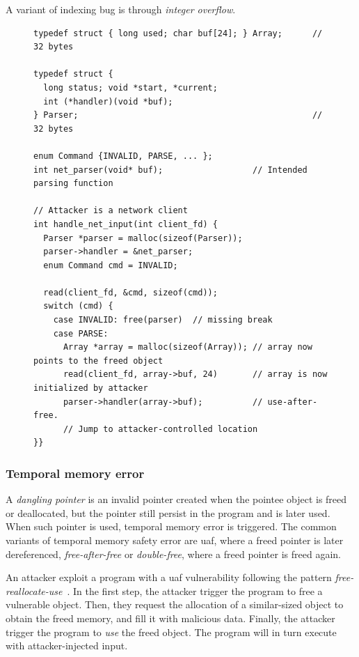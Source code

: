 \documentclass[11pt]{memoir}
\begin{document}
A variant of indexing bug is through \emph{integer overflow}.







\begin{figure}[t]
\begin{verbatim}
typedef struct { long used; char buf[24]; } Array;      // 32 bytes

typedef struct {
  long status; void *start, *current;
  int (*handler)(void *buf);
} Parser;                                               // 32 bytes

enum Command {INVALID, PARSE, ... };
int net_parser(void* buf);                  // Intended parsing function

// Attacker is a network client
int handle_net_input(int client_fd) {
  Parser *parser = malloc(sizeof(Parser));
  parser->handler = &net_parser; 
  enum Command cmd = INVALID;

  read(client_fd, &cmd, sizeof(cmd));
  switch (cmd) {
    case INVALID: free(parser)  // missing break
    case PARSE:
      Array *array = malloc(sizeof(Array)); // array now points to the freed object 
      read(client_fd, array->buf, 24)       // array is now initialized by attacker
      parser->handler(array->buf);          // use-after-free.
      // Jump to attacker-controlled location
}}
\end{verbatim}
\end{figure}



\subsubsection{Temporal memory error}

A \emph{dangling pointer} is an invalid pointer created when the pointee object
is freed or deallocated, but the pointer still persist in the program and is later
used.
When such pointer is used, temporal memory error is triggered.
The common variants of temporal memory safety error are \gls{uaf}, where a
freed pointer is later dereferenced, \emph{free-after-free} or \emph{double-free},
where a freed pointer is freed again.


An attacker exploit a program with a \gls{uaf} vulnerability following the pattern
\emph{free-reallocate-use}~\cite{wickman2021preventing}.
In the first step, the attacker trigger the program to free a vulnerable object. 
Then, they request the allocation of a similar-sized object to obtain the freed
memory, and fill it with malicious data.
Finally, the attacker trigger the program to \emph{use} the freed object. 
The program will in turn execute with attacker-injected input.
\end{document}
